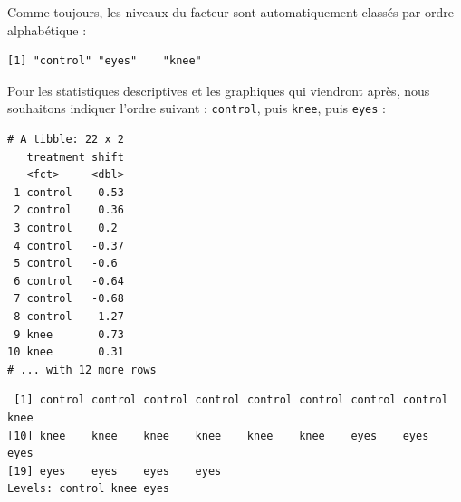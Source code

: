 \documentclass[
  a4paper,
]{article}
\newenvironment{Shaded}{\begin{snugshade}}{\end{snugshade}}
\newcommand{\DataTypeTok}[1]{\textcolor[rgb]{0.00,0.34,0.68}{#1}}
\newcommand{\KeywordTok}[1]{\textcolor[rgb]{0.12,0.11,0.11}{\textbf{#1}}}
\newcommand{\NormalTok}[1]{\textcolor[rgb]{0.12,0.11,0.11}{#1}}
\newcommand{\OperatorTok}[1]{\textcolor[rgb]{0.12,0.11,0.11}{#1}}
\newcommand{\StringTok}[1]{\textcolor[rgb]{0.75,0.01,0.01}{#1}}
\begin{document}
Comme toujours, les niveaux du facteur sont automatiquement classés par ordre alphabétique :

\begin{Shaded}
\end{Shaded}

\begin{verbatim}
[1] "control" "eyes"    "knee"   
\end{verbatim}

Pour les statistiques descriptives et les graphiques qui viendront après, nous souhaitons indiquer l'ordre suivant : \texttt{control}, puis \texttt{knee}, puis \texttt{eyes} :

\begin{Shaded}
\end{Shaded}

\begin{verbatim}
# A tibble: 22 x 2
   treatment shift
   <fct>     <dbl>
 1 control    0.53
 2 control    0.36
 3 control    0.2 
 4 control   -0.37
 5 control   -0.6 
 6 control   -0.64
 7 control   -0.68
 8 control   -1.27
 9 knee       0.73
10 knee       0.31
# ... with 12 more rows
\end{verbatim}

\begin{Shaded}
\end{Shaded}

\begin{verbatim}
 [1] control control control control control control control control knee   
[10] knee    knee    knee    knee    knee    knee    eyes    eyes    eyes   
[19] eyes    eyes    eyes    eyes   
Levels: control knee eyes
\end{verbatim}
\end{document}
